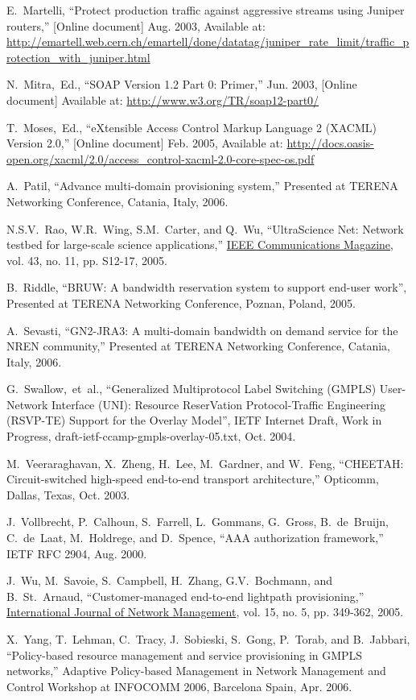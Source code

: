 \documentclass[conference]{IEEEtran}
\begin{document}
\begin{thebibliography}{1}
E.~Martelli,
``Protect production traffic against aggressive streams using Juniper routers,''
[Online document] Aug. 2003, Available at:
\url{http://emartell.web.cern.ch/emartell/done/datatag/juniper_rate_limit/traffic_protection_with_juniper.html}

N.~Mitra,~Ed.,
``SOAP Version 1.2 Part 0: Primer,'' Jun. 2003, [Online document] Available at:
\url{http://www.w3.org/TR/soap12-part0/}

T.~Moses,~Ed.,
``eXtensible Access Control Markup Language 2 (XACML) Version 2.0,''
[Online document] Feb. 2005, Available at:
\url{http://docs.oasis-open.org/xacml/2.0/access_control-xacml-2.0-core-spec-os.pdf}

A.~Patil,
``Advance multi-domain provisioning system,''
Presented at TERENA Networking Conference, Catania, Italy, 2006.

N.S.V.~Rao, W.R.~Wing, S.M.~Carter, and Q.~Wu,
``UltraScience Net: Network testbed for large-scale science applications,''
\underline{IEEE Communications Magazine}, vol. 43, no. 11, pp. S12-17, 2005.

B.~Riddle,
``BRUW: A bandwidth reservation system to support end-user work'',
Presented at TERENA Networking Conference, Poznan, Poland, 2005.

A.~Sevasti,
``GN2-JRA3: A multi-domain bandwidth on demand service for the NREN community,''
Presented at TERENA Networking Conference, Catania, Italy, 2006.

G.~Swallow,~et~al.,
``Generalized Multiprotocol Label Switching (GMPLS) User-Network Interface
(UNI): Resource ReserVation Protocol-Traffic Engineering (RSVP-TE) Support
for the Overlay Model'', IETF Internet Draft, Work in Progress,
draft-ietf-ccamp-gmpls-overlay-05.txt, Oct. 2004.

M.~Veeraraghavan, X.~Zheng, H.~Lee, M.~Gardner, and W.~Feng,
``CHEETAH: Circuit-switched high-speed end-to-end transport architecture,''
Opticomm, Dallas, Texas, Oct. 2003.

J.~Vollbrecht, P.~Calhoun, S.~Farrell, L.~Gommans, G.~Gross, B.~de~Bruijn,
C.~de~Laat, M.~Holdrege, and D.~Spence,
``AAA authorization framework,'' IETF RFC 2904, Aug. 2000.

J.~Wu, M.~Savoie, S.~Campbell, H.~Zhang, G.V.~Bochmann, and B.~St.~Arnaud,
``Customer-managed end-to-end lightpath provisioning,''
\underline{International Journal of Network Management},
vol. 15, no. 5, pp. 349-362, 2005.

X.~Yang, T.~Lehman, C.~Tracy, J.~Sobieski, S.~Gong, P.~Torab, and B.~Jabbari,
``Policy-based resource management and service provisioning in GMPLS networks,''
Adaptive Policy-based Management in Network Management and Control Workshop
at INFOCOMM 2006, Barcelona Spain, Apr. 2006.

\end{thebibliography}
\end{document}
